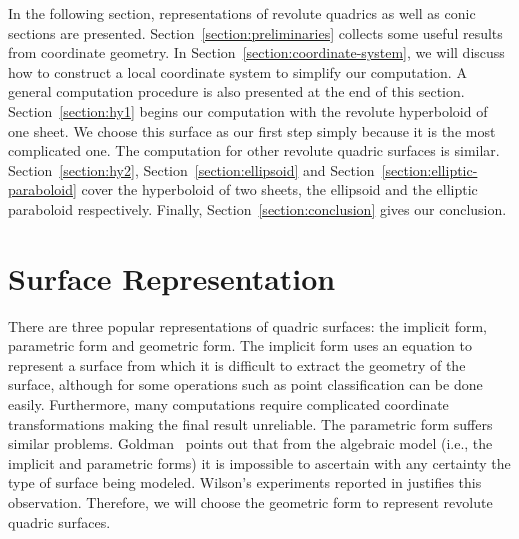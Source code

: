      In the following section, representations of revolute quadrics as well as
conic sections are presented.  Section~\ref{section:preliminaries} collects some
useful results from coordinate geometry.  
In Section~\ref{section:coordinate-system}, we will discuss how to construct
a local coordinate system to simplify our computation.  A general computation 
procedure is also presented at the end of this section.  
Section~\ref{section:hy1} begins our computation with the
revolute hyperboloid of one sheet.  We choose this surface as our first step
simply because it is the most complicated one.  The computation for
other revolute quadric surfaces is similar.  Section~\ref{section:hy2},
Section~\ref{section:ellipsoid} and Section~\ref{section:elliptic-paraboloid}
cover the hyperboloid of two sheets, the ellipsoid and the elliptic
paraboloid respectively.  Finally, Section~\ref{section:conclusion} gives our 
conclusion.


\section{Surface Representation}
\label{section:representation}

     There are three popular representations of quadric surfaces: the implicit
form, parametric form and geometric form.  The implicit form uses an equation
to represent a surface from which it is difficult to extract the geometry
of the surface, although for some operations such as point classification can 
be done easily.  Furthermore, many computations require complicated coordinate
transformations making the final result unreliable.  The parametric form 
suffers similar problems.  Goldman~\cite{goldman:1983b} points out that from 
the algebraic model (i.e., the implicit and parametric forms) it is impossible
to ascertain with any certainty the type of surface being modeled.  Wilson's 
experiments reported in \cite{wilson:1987} justifies this observation.  
Therefore, we will choose the geometric form to represent revolute quadric 
surfaces.
     
